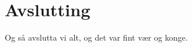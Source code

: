 \chapter{Avslutting}
\thispagestyle{fancy}
Og så avslutta vi alt, og det var fint vær og konge.

    